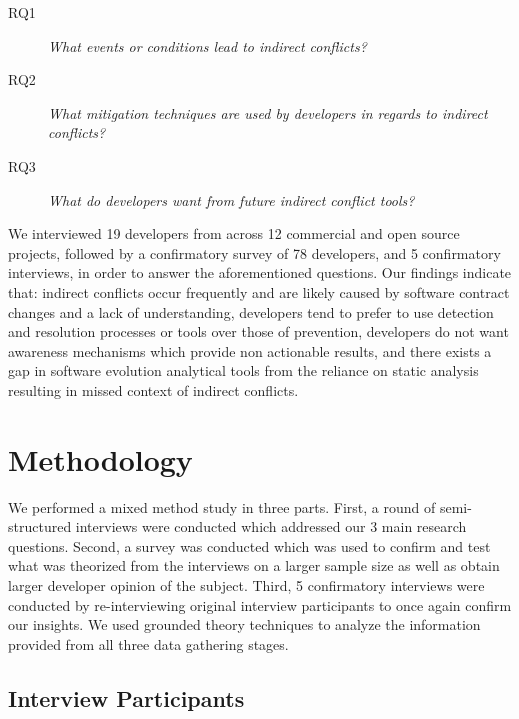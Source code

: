 \documentclass[conference]{IEEEtran}
\makeatletter
\def\namedlabel#1#2{\begingroup
   \def\@currentlabel{#2}%
   \label{#1}\endgroup
}
\makeatother
\begin{document}
\begin{description}
	\item[RQ1\namedlabel{itm:rq1}{RQ1}] \textit{What events or conditions lead to indirect conflicts?}
	\item[RQ2\namedlabel{itm:rq2}{RQ2}] \textit{What mitigation techniques are used by developers in regards to indirect conflicts?}
	\item[RQ3\namedlabel{itm:rq3}{RQ3}] \textit{What do developers want from future indirect conflict tools?}
\end{description}

We interviewed 19 developers from across 12 commercial and open source projects, followed by a confirmatory survey of 78 
developers, and 5 confirmatory interviews, in order to answer the aforementioned questions. Our findings indicate that: 
indirect conflicts occur frequently and are likely caused by software contract changes and a lack of understanding,
developers tend to prefer to use detection and resolution processes or tools
over those of prevention, developers do not want awareness mechanisms which provide non actionable results, 
and there exists a gap in software evolution analytical tools from the reliance on static analysis resulting in missed
context of indirect conflicts.

\section{Methodology}
\label{sec:meth}

We performed a mixed method study in three parts. First, a round of semi-structured interviews were conducted which 
addressed our 3 main research questions. Second, a survey was conducted
which was used to confirm and test what was theorized from the interviews on a larger sample size as well as obtain
larger developer opinion of the subject. Third, 5 confirmatory interviews were conducted by re-interviewing original
interview participants to once again confirm our insights.
We used grounded theory techniques to analyze the information provided from all three data gathering stages.

\subsection{Interview Participants}
\end{document}
